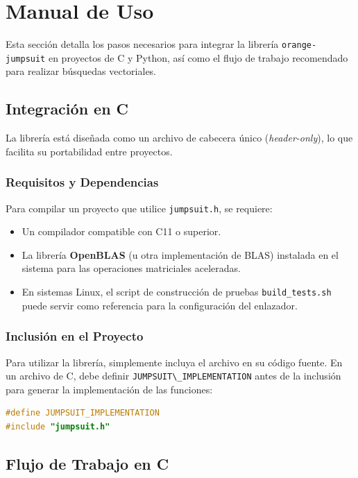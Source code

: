 \section{Manual de Uso}

Esta secci\'on detalla los pasos necesarios para integrar la librer\'ia
\texttt{orange-jumpsuit} en proyectos de C y Python, as\'i como el flujo de
trabajo recomendado para realizar b\'usquedas vectoriales.

\subsection{Integraci\'on en C}

La librería est\'a dise\~nada como un archivo de cabecera \'unico
(\textit{header-only}), lo que facilita su portabilidad entre 
proyectos.

\subsubsection{Requisitos y Dependencias}
Para compilar un proyecto que utilice \texttt{jumpsuit.h}, se requiere:
\begin{itemize}
    \item Un compilador compatible con C11 o superior.
    \item La librería \textbf{OpenBLAS} (u otra implementaci\'on de BLAS) 
      instalada en el sistema para las operaciones matriciales aceleradas.
    \item En sistemas Linux, el script de construcci\'on de pruebas 
      \texttt{build\_tests.sh} puede servir como referencia para la 
      configuraci\'on del enlazador.
\end{itemize}

\subsubsection{Inclusi\'on en el Proyecto}
Para utilizar la librer\'ia, simplemente incluya el archivo en su c\'odigo
fuente. 
En un archivo de C, debe definir \verb|JUMPSUIT\_IMPLEMENTATION|
antes de la inclusi\'on para generar la implementaci\'on de las funciones:

\begin{lstlisting}[language=C]
#define JUMPSUIT_IMPLEMENTATION
#include "jumpsuit.h"
\end{lstlisting}

\subsection{Flujo de Trabajo en C}


